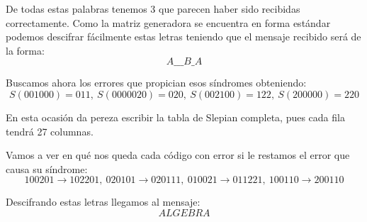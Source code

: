 \begin{problem}[5]
De todas estas palabras tenemos 3 que parecen haber sido recibidas correctamente. Como la matriz generadora se encuentra en forma estándar podemos descifrar fácilmente estas letras teniendo que el mensaje recibido será de la forma:
\[A\_\_\_B\_A \]

Buscamos ahora los errores que propician esos síndromes obteniendo:
\[S(001000) = 011, \ S(0000020) = 020, \ S(002100) = 122, \ S(200000)=220\]

En esta ocasión da pereza escribir la tabla de Slepian completa, pues cada fila tendrá 27 columnas.

Vamos a ver en qué nos queda cada código con error si le restamos el error que causa su síndrome:
\[100201 \to 102201, \ 020101 \to 020111, \ 010021 \to 011221, \ 100110 \to 200110\]

Descifrando estas letras llegamos al mensaje:
\[ALGEBRA \]
\end{problem}


